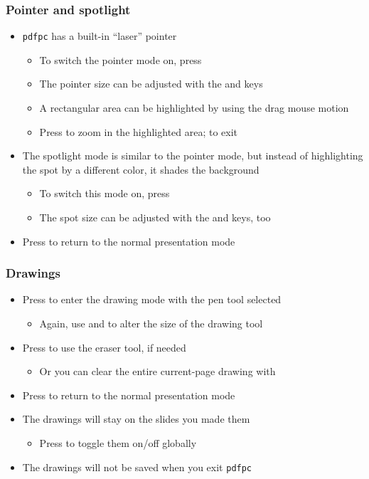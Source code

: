 \documentclass{beamer}
\newcommand{\singleitem}[1]{\begin{itemize}\item #1\end{itemize}}
\newcommand{\pdfpc}{\texttt{pdfpc}\xspace}
\begin{document}
\begin{frame}
  \frametitle{Pointer and spotlight}
  \begin{itemize}
    \item \pdfpc has a built-in ``laser'' pointer
      \begin{itemize}
        \item To switch the pointer mode on, press 
        \item The pointer size can be adjusted with the \keys{{+}} and \keys{-}
          keys
        \item A rectangular area can be highlighted by using the drag mouse
          motion
        \item Press  to zoom in the highlighted area;  to exit
      \end{itemize}
    \item The spotlight mode is similar to the pointer mode, but instead of
      highlighting the spot by a different color, it shades the background
      \begin{itemize}
        \item To switch this mode on, press 
        \item The spot size can be adjusted with the \keys{{+}} and \keys{-}
          keys, too
      \end{itemize}
    \item Press  to return to the normal presentation mode
  \end{itemize}
\end{frame}

\begin{frame}
  \frametitle{Drawings}
  \begin{itemize}
    \item Press  to enter the drawing mode with the pen tool selected
      \singleitem{Again, use \keys{{+}} and \keys{-} to alter the size of the
        drawing tool}
    \item Press  to use the eraser tool, if needed
      \singleitem{Or you can clear the entire current-page drawing with
        \keys{C}}
    \item Press  to return to the normal presentation mode
    \item The drawings will stay on the slides you made them
      \singleitem{Press  to toggle them on/off globally}
    \item The drawings will \alert{not} be saved when you exit \pdfpc
  \end{itemize}
\end{frame}
\end{document}
